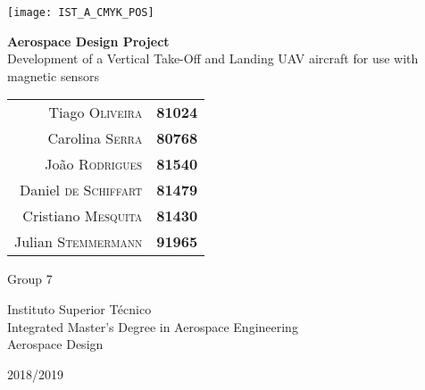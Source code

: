 %
\thispagestyle{empty}

\texttt{[image: IST\_A\_CMYK\_POS]}
	
\begin{center}
	\vspace{40mm} %
    \vspace{2mm}
	{\Huge\bfseries Aerospace Design Project} \\
	\vspace{5mm} %
	{\Large Development of a Vertical Take-Off and Landing UAV aircraft for use with magnetic sensors}
	
	\vspace{\fill} %
	
	\normalsize
	\begin{tabular}{r l|}
		Tiago \textsc{Oliveira} & \textbf{81024} \\
		Carolina \textsc{Serra} & \textbf{80768} \\
		João \textsc{Rodrigues} & \textbf{81540} \\
		Daniel \textsc{de Schiffart} & \textbf{81479} \\
		Cristiano \textsc{Mesquita} & \textbf{81430} \\
		Julian \textsc{Stemmermann} & \textbf{91965}
	\end{tabular}\hspace*{2mm} {\Large Group 7}
	
	
	\vspace{10mm} %
	\Large Instituto Superior Técnico \\
	Integrated Master's Degree in Aerospace Engineering \\
	\vspace{1mm}
	\large Aerospace Design
	
	\vspace{10mm} %
	\Large 2018/2019
\end{center}

\pagebreak
